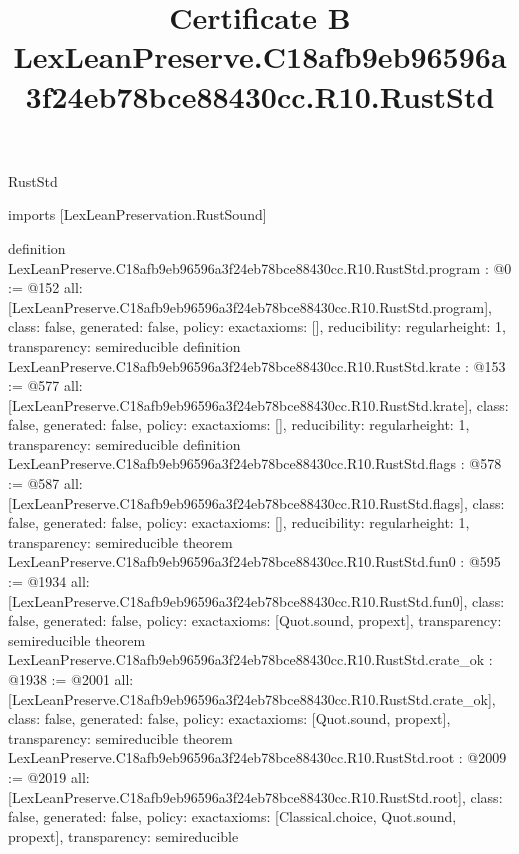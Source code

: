 \begin{lexlean}{RustStd}
\title{Certificate B LexLeanPreserve.C18afb9eb96596a3f24eb78bce88430cc.R10.RustStd}
\begin{coremodule}
imports [LexLeanPreservation.RustSound]

definition LexLeanPreserve.C18afb9eb96596a3f24eb78bce88430cc.R10.RustStd.program : @0 := @152 {
  all: [LexLeanPreserve.C18afb9eb96596a3f24eb78bce88430cc.R10.RustStd.program],
  class: false,
  generated: false,
  policy: exact{axioms: []},
  reducibility: regular{height: 1},
  transparency: semireducible
}
definition LexLeanPreserve.C18afb9eb96596a3f24eb78bce88430cc.R10.RustStd.krate : @153 := @577 {
  all: [LexLeanPreserve.C18afb9eb96596a3f24eb78bce88430cc.R10.RustStd.krate],
  class: false,
  generated: false,
  policy: exact{axioms: []},
  reducibility: regular{height: 1},
  transparency: semireducible
}
definition LexLeanPreserve.C18afb9eb96596a3f24eb78bce88430cc.R10.RustStd.flags : @578 := @587 {
  all: [LexLeanPreserve.C18afb9eb96596a3f24eb78bce88430cc.R10.RustStd.flags],
  class: false,
  generated: false,
  policy: exact{axioms: []},
  reducibility: regular{height: 1},
  transparency: semireducible
}
theorem LexLeanPreserve.C18afb9eb96596a3f24eb78bce88430cc.R10.RustStd.fun0 : @595 := @1934 {
  all: [LexLeanPreserve.C18afb9eb96596a3f24eb78bce88430cc.R10.RustStd.fun0],
  class: false,
  generated: false,
  policy: exact{axioms: [Quot.sound, propext]},
  transparency: semireducible
}
theorem LexLeanPreserve.C18afb9eb96596a3f24eb78bce88430cc.R10.RustStd.crate_ok : @1938 := @2001 {
  all: [LexLeanPreserve.C18afb9eb96596a3f24eb78bce88430cc.R10.RustStd.crate_ok],
  class: false,
  generated: false,
  policy: exact{axioms: [Quot.sound, propext]},
  transparency: semireducible
}
theorem LexLeanPreserve.C18afb9eb96596a3f24eb78bce88430cc.R10.RustStd.root : @2009 := @2019 {
  all: [LexLeanPreserve.C18afb9eb96596a3f24eb78bce88430cc.R10.RustStd.root],
  class: false,
  generated: false,
  policy: exact{axioms: [Classical.choice, Quot.sound, propext]},
  transparency: semireducible
}


\end{coremodule}
\end{lexlean}
